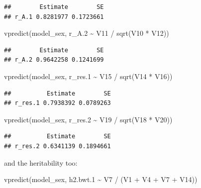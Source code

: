 \documentclass[
  12pt,
]{book}
\newenvironment{Shaded}{\begin{snugshade}}{\end{snugshade}}
\newcommand{\FloatTok}[1]{\textcolor[rgb]{0.00,0.00,0.81}{#1}}
\newcommand{\FunctionTok}[1]{\textcolor[rgb]{0.00,0.00,0.00}{#1}}
\newcommand{\NormalTok}[1]{#1}
\newcommand{\SpecialCharTok}[1]{\textcolor[rgb]{0.00,0.00,0.00}{#1}}
\begin{document}
\begin{verbatim}
##        Estimate        SE
## r_A.1 0.8281977 0.1723661
\end{verbatim}

\begin{Shaded}
\begin{Highlighting}[]
\FunctionTok{vpredict}\NormalTok{(model\_sex, r\_A}\FloatTok{.2} \SpecialCharTok{\textasciitilde{}}\NormalTok{ V11 }\SpecialCharTok{/} \FunctionTok{sqrt}\NormalTok{(V10 }\SpecialCharTok{*}\NormalTok{ V12))}
\end{Highlighting}
\end{Shaded}

\begin{verbatim}
##        Estimate        SE
## r_A.2 0.9642258 0.1241699
\end{verbatim}

\begin{Shaded}
\begin{Highlighting}[]
\FunctionTok{vpredict}\NormalTok{(model\_sex, r\_res}\FloatTok{.1} \SpecialCharTok{\textasciitilde{}}\NormalTok{ V15 }\SpecialCharTok{/} \FunctionTok{sqrt}\NormalTok{(V14 }\SpecialCharTok{*}\NormalTok{ V16))}
\end{Highlighting}
\end{Shaded}

\begin{verbatim}
##          Estimate        SE
## r_res.1 0.7938392 0.0789263
\end{verbatim}

\begin{Shaded}
\begin{Highlighting}[]
\FunctionTok{vpredict}\NormalTok{(model\_sex, r\_res}\FloatTok{.2} \SpecialCharTok{\textasciitilde{}}\NormalTok{ V19 }\SpecialCharTok{/} \FunctionTok{sqrt}\NormalTok{(V18 }\SpecialCharTok{*}\NormalTok{ V20))}
\end{Highlighting}
\end{Shaded}

\begin{verbatim}
##          Estimate        SE
## r_res.2 0.6341139 0.1894661
\end{verbatim}

and the heritability too:

\begin{Shaded}
\begin{Highlighting}[]
\FunctionTok{vpredict}\NormalTok{(model\_sex, h2.bwt}\FloatTok{.1} \SpecialCharTok{\textasciitilde{}}\NormalTok{ V7 }\SpecialCharTok{/}\NormalTok{ (V1 }\SpecialCharTok{+}\NormalTok{ V4 }\SpecialCharTok{+}\NormalTok{ V7 }\SpecialCharTok{+}\NormalTok{ V14))}
\end{Highlighting}
\end{Shaded}
\end{document}
